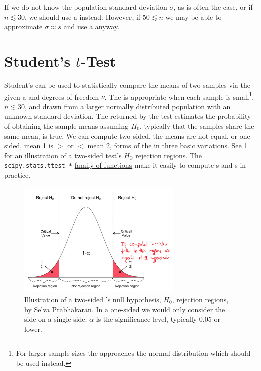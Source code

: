 If we do not know the population standard deviation $\sigma$, as is often the case,
or if $n \lesssim 30$, we should use a \ttest instead.
However, if $50 \lesssim n$ we may be able to approximate $\sigma \approx s$
and use a \Ztest anyway.

\section{Student's \texorpdfstring{$t$}{t}-Test}
\label{hypo:t_test}

Student's \ttest can be used to
statistically compare the means of two samples via the \tdist
given a \tstat and degrees of freedom $\nu$.
The \ttest is appropriate when each sample is small\footnote{For
larger sample sizes the \tdist approaches the normal distribution which should be used instead.}, $n \lesssim 30$,
and drawn from a larger normally distributed population with an unknown standard deviation.
The \pvalue returned by the test estimates the probability of obtaining the sample means
assuming $H_{0}$, typically that the samples share the same mean, is true.
We can compute two-sided, \ie the means are not equal, or one-sided, \ie mean 1 is $>$ or $<$ mean 2,
forms of the \ttest in three basic variations.
See \cref{fig:two_sided_t_test} for an illustration of a two-sided test's $H_{0}$ rejection regions.
The \texttt{scipy.stats.ttest\_*}
\href{https://docs.scipy.org/doc/scipy/reference/stats.html#statistical-tests}{family of functions}
make it easily to compute {\tstat}s and {\pvalue}s in practice.

\begin{figure}
\centering
\includegraphics[width=0.7\textwidth]{figures/stats/one_side_t_test_rejection_regions.png}
\caption{
Illustration of a two-sided {\ttest}'s null hypothesis, $H_{0}$, rejection regions,
by \href{https://www.machinelearningplus.com/statistics/t-test-students-understanding-the-math-and-how-it-works/}{Selva Prabhakaran}.
In a one-sided \ttest we would only consider the side on a single side.
$\alpha$ is the significance level, typically \num{0.05} or lower.
}
\label{fig:two_sided_t_test}
\end{figure}

